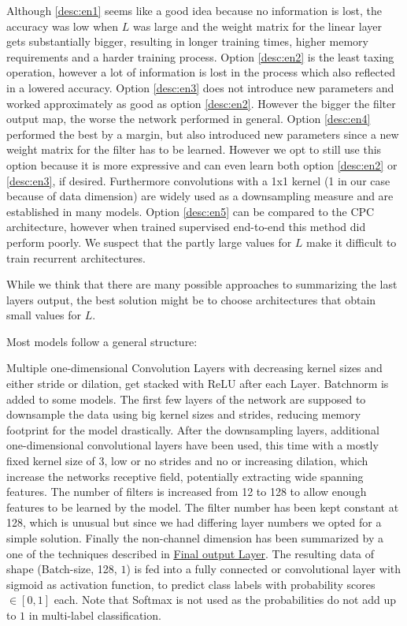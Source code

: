 Although \ref{desc:en1} seems like a good idea because no information is lost, the accuracy was low when $L$ was large and the weight matrix for the linear layer gets substantially bigger, resulting in longer training times, higher memory requirements and a harder training process.
Option \ref{desc:en2}  is the least taxing operation, however a lot of information is lost in the process which also reflected in a lowered accuracy.
Option \ref{desc:en3}  does not introduce new parameters and worked approximately as good as option \ref{desc:en2}.  However the bigger the filter output map, the worse the network performed in general.
Option \ref{desc:en4}  performed the best by a margin, but also introduced new parameters since a new weight matrix for the filter has to be learned. However we opt to still use this option because it is more expressive and can even learn both option \ref{desc:en2} or \ref{desc:en3}, if desired. Furthermore convolutions with a 1x1 kernel (1 in our case because of data dimension) are widely used as a downsampling measure and are established in many models.
Option \ref{desc:en5}  can be compared to the CPC architecture, however when trained supervised end-to-end this method did perform poorly. We suspect that the partly large values for $L$ make it difficult to train recurrent architectures.

While we think that there are many possible approaches to summarizing the last layers output, the best solution might be to choose architectures that obtain small values for $L$.

Most models follow a general structure: 

Multiple one-dimensional Convolution Layers with decreasing kernel sizes and either stride or dilation, get stacked with ReLU after each Layer. Batchnorm is added to some models. The first few layers of the network are supposed to downsample the data using big kernel sizes and strides, reducing memory footprint for the model drastically. After the downsampling layers, additional one-dimensional convolutional layers have been used, this time with a mostly fixed kernel size of 3, low or no strides and no or increasing dilation, which increase the networks receptive field, potentially extracting wide spanning features. The number of filters is increased from 12 to 128 to allow enough features to be learned by the model. The filter number has been kept constant at 128, which is unusual but since we had differing layer numbers we opted for a simple solution. Finally the non-channel dimension has been summarized by a one of the techniques described in \hyperref[desc:en1]{\underline{Final output Layer}}. The resulting data of shape (Batch-size, 128, $1$) is fed into a fully connected or convolutional layer with sigmoid as activation function, to predict class labels with probability scores $\in [0, 1]$ each. Note that Softmax is not used as the probabilities do not add up to $1$ in multi-label classification. 

